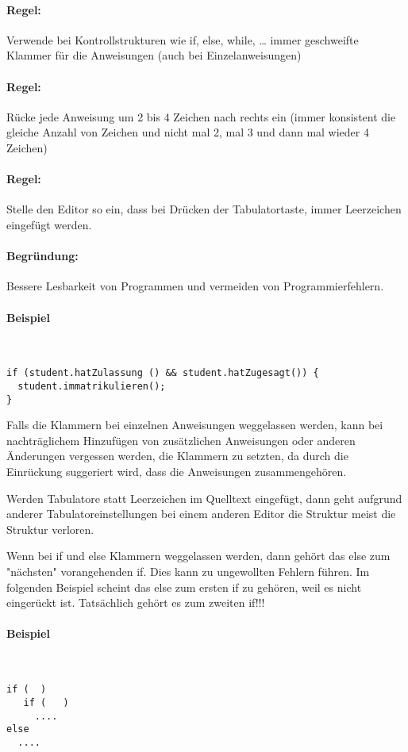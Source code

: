 \paragraph{Regel:} Verwende bei Kontrollstrukturen wie if, else, while, … immer geschweifte Klammer für die Anweisungen (auch bei Einzelanweisungen)
\paragraph{Regel:} Rücke jede Anweisung um 2 bis 4 Zeichen nach rechts ein (immer konsistent die gleiche Anzahl von Zeichen und nicht mal 2, mal 3 und dann mal wieder 4 Zeichen)
\paragraph{Regel:} Stelle den Editor so ein, dass bei Drücken der Tabulatortaste, immer Leerzeichen eingefügt werden.
\paragraph{Begründung:} Bessere Lesbarkeit von Programmen und vermeiden von Programmierfehlern.

\paragraph{Beispiel} \hspace{0pt}\\
\begin{lstlisting}
if (student.hatZulassung () && student.hatZugesagt()) {
  student.immatrikulieren();
}
\end{lstlisting}

Falls die Klammern bei einzelnen Anweisungen weggelassen werden, kann bei nachträglichem Hinzufügen von zusätzlichen Anweisungen oder anderen Änderungen vergessen werden, die Klammern zu setzten, da durch die Einrückung suggeriert wird, dass die Anweisungen zusammengehören.

Werden Tabulatore statt Leerzeichen im Quelltext eingefügt, dann geht aufgrund anderer Tabulatoreinstellungen bei einem anderen Editor die Struktur meist die Struktur verloren.

Wenn bei if und else Klammern weggelassen werden, dann gehört das else zum "nächsten" vorangehenden if. Dies kann zu ungewollten Fehlern führen. Im folgenden Beispiel scheint das else zum ersten if zu gehören, weil es nicht eingerückt ist. Tatsächlich gehört es zum zweiten if!!!

\paragraph{Beispiel} \hspace{0pt}\\
\begin{lstlisting}
if (  ) 
   if (   )
     ....
else 
  ....
\end{lstlisting}


